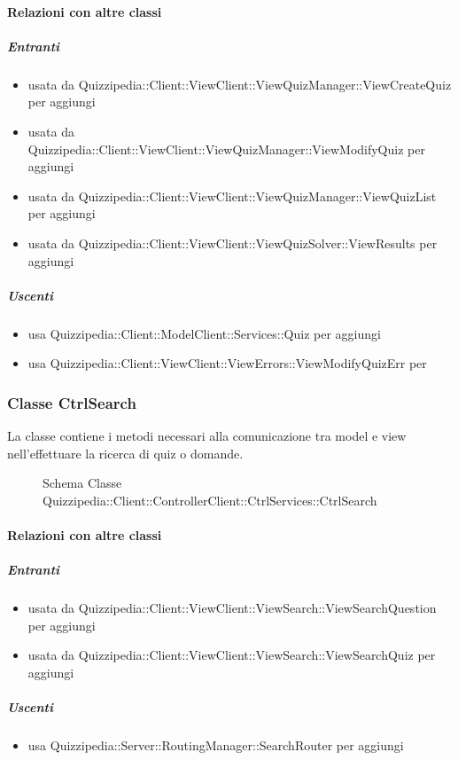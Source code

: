 \paragraph{Relazioni con altre classi}
\subparagraph{Entranti}
\begin{itemize}
\item usata da Quizzipedia::Client::ViewClient::ViewQuizManager::ViewCreateQuiz per aggiungi
\item usata da Quizzipedia::Client::ViewClient::ViewQuizManager::ViewModifyQuiz per aggiungi
\item usata da Quizzipedia::Client::ViewClient::ViewQuizManager::ViewQuizList per aggiungi
\item usata da Quizzipedia::Client::ViewClient::ViewQuizSolver::ViewResults per aggiungi
\end{itemize}
\subparagraph{Uscenti}
\begin{itemize}
\item usa Quizzipedia::Client::ModelClient::Services::Quiz per aggiungi
\item usa Quizzipedia::Client::ViewClient::ViewErrors::ViewModifyQuizErr per 
\end{itemize}
\subsubsection{Classe CtrlSearch}
La classe contiene i metodi necessari alla comunicazione tra model e view nell'effettuare la ricerca di quiz o domande.
\begin{figure}[H]
\centering
\noindent{}
\caption[Schema Classe CtrlSearch]{Schema Classe Quizzipedia::Client::ControllerClient::CtrlServices::CtrlSearch}
\end{figure}
\paragraph{Relazioni con altre classi}
\subparagraph{Entranti}
\begin{itemize}
\item usata da Quizzipedia::Client::ViewClient::ViewSearch::ViewSearchQuestion per aggiungi
\item usata da Quizzipedia::Client::ViewClient::ViewSearch::ViewSearchQuiz per aggiungi
\end{itemize}
\subparagraph{Uscenti}
\begin{itemize}
\item usa Quizzipedia::Server::RoutingManager::SearchRouter per aggiungi
\end{itemize}
